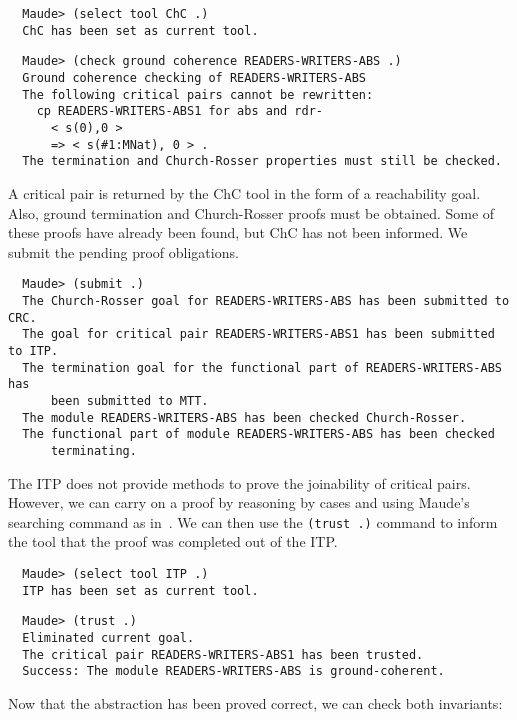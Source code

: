 \begin{small}
\begin{verbatim}
  Maude> (select tool ChC .)
  ChC has been set as current tool.
\end{verbatim}
\end{small}

\begin{small}
\begin{verbatim}
  Maude> (check ground coherence READERS-WRITERS-ABS .)
  Ground coherence checking of READERS-WRITERS-ABS
  The following critical pairs cannot be rewritten:
    cp READERS-WRITERS-ABS1 for abs and rdr-
      < s(0),0 >
      => < s(#1:MNat), 0 > .
  The termination and Church-Rosser properties must still be checked.
\end{verbatim}
\end{small}
%
A critical pair is returned by the ChC tool in the form of a reachability goal.
Also, ground termination and Church-Rosser proofs must be 
obtained. Some of these proofs have already been found, but ChC has not been informed. 
We submit the pending proof obligations.

\begin{small}
\begin{verbatim}
  Maude> (submit .)
  The Church-Rosser goal for READERS-WRITERS-ABS has been submitted to CRC.
  The goal for critical pair READERS-WRITERS-ABS1 has been submitted to ITP.
  The termination goal for the functional part of READERS-WRITERS-ABS has 
      been submitted to MTT.
  The module READERS-WRITERS-ABS has been checked Church-Rosser.
  The functional part of module READERS-WRITERS-ABS has been checked 
      terminating.
\end{verbatim}
\end{small}
%
The ITP does not provide methods to prove the joinability of critical pairs. 
However, we can carry on a proof by reasoning by cases and using Maude's searching 
command as in~\cite[Section 12.4]{CDELMMT:2007-book}. We can then use the 
\verb~(trust .)~ command to inform the tool that the proof was completed out of the 
ITP. 

\begin{small}
\begin{verbatim}
  Maude> (select tool ITP .)
  ITP has been set as current tool.
\end{verbatim}
\end{small}

\begin{small}
\begin{verbatim}
  Maude> (trust .)
  Eliminated current goal.
  The critical pair READERS-WRITERS-ABS1 has been trusted.
  Success: The module READERS-WRITERS-ABS is ground-coherent.
\end{verbatim}
\end{small}
%
Now that the abstraction has been proved correct, we can check 
both invariants:

